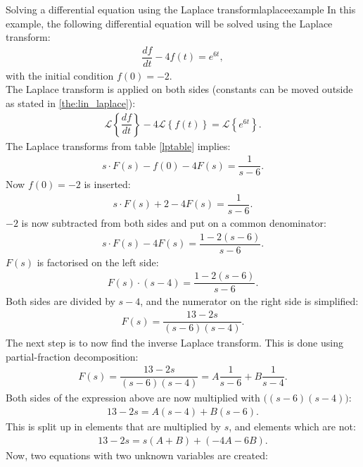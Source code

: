 \begin{example}{Solving a differential equation using the Laplace transform}{laplaceexample}
In this example, the following differential equation will be solved using the Laplace transform:
\begin{align}
\dfrac{df}{dt}-4f(t)=e^{6t}, \label{eq:lap_ex}
\end{align} 
with the initial condition $f(0)=-2$.
\\
The Laplace transform is applied on both sides (constants can be moved outside as stated in \cref{the:lin_laplace}):
\begin{align*}
\mathcal{L} \left\{\dfrac{df}{dt} \right\}-4 
\mathcal{L} \left\{f(t) \right\} = 
\mathcal{L} \left\{e^{6t} \right\}.
\end{align*}
The Laplace transforms from table \ref{lptable} implies:
\begin{align*}
s \cdot F(s) - f(0) - 4F(s)= \dfrac{1}{s-6}.
\end{align*}
Now $f(0)=-2$ is inserted:
\begin{align*}
s \cdot F(s) + 2 - 4F(s)= \dfrac{1}{s-6}.
\end{align*}
$-2$ is now subtracted from both sides and put on a common denominator:
\begin{align*}
s \cdot F(s) - 4F(s)= \dfrac{1-2(s-6)}{s-6}.
\end{align*}
$F(s)$ is factorised on the left side:
\begin{align*}
F(s) \cdot (s-4) = \dfrac{1-2(s-6)}{s-6}.
\end{align*}
Both sides are divided by $s-4$, and the numerator on the right side is simplified:
\begin{align*}
F(s) = \dfrac{13-2s}{(s-6)(s-4)}.
\end{align*}
The next step is to now find the inverse Laplace transform. This is done using partial-fraction decomposition: \cite[p.~537]{calc}
\begin{align}
F(s) = \dfrac{13-2s}{(s-6)(s-4)} = A \dfrac{1}{s-6} + B \dfrac{1}{s-4}.
\label{par_dec}
\end{align}
Both sides of the expression above are now multiplied with $\big((s-6)(s-4)\big)$:
\begin{align*}
13-2s = A(s-4) + B(s-6).
\end{align*}
This is split up in elements that are multiplied by $s$, and elements which are not:
\begin{align*}
13-2s = s(A+B)+(-4A-6B).
\end{align*}
Now, two equations with two unknown variables are created:

\end{example}
